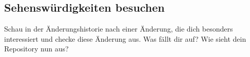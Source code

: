 \subsection{Sehenswürdigkeiten besuchen}
Schau in der Änderungshistorie nach einer Änderung, die dich besonders interessiert und checke diese Änderung aus. Was fällt dir auf? Wie sieht dein Repository nun aus?

